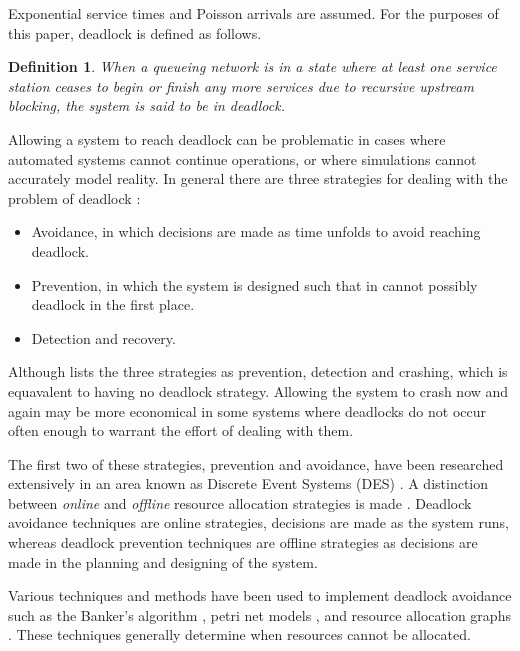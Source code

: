 \documentclass{article}
\newtheorem{definition}{Definition}
\numberwithin{equation}{section}
\begin{document}
Exponential service times and Poisson arrivals are assumed.
For the purposes of this paper, deadlock is defined as follows.\\

\begin{definition}
    When a queueing network is in a state where at least one service
    station ceases to begin or finish any more services due to
    recursive upstream blocking, the system is said to be in deadlock.
\end{definition}


Allowing a system to reach deadlock can be problematic in cases where automated systems cannot continue operations, or where simulations cannot accurately model reality.
In general there are three strategies for dealing with the problem of deadlock \cite{kawadkaretal14, elmagarmid86, venkateshsmith05}:

\begin{itemize}
  \item Avoidance, in which decisions are made as time unfolds to avoid reaching deadlock.
  \item Prevention, in which the system is designed such that in cannot possibly deadlock in the first place.
  \item Detection and recovery.
\end{itemize}

Although \cite{holt72} lists the three strategies as prevention, detection and crashing, which is equavalent to having no deadlock strategy. Allowing the system to crash now and again may be more economical in some systems where deadlocks do not occur often enough to warrant the effort of dealing with them.

The first two of these strategies, prevention and avoidance, have been researched extensively in an area known as Discrete Event Systems (DES) \cite{reveliotis15a, reveliotis15b}.
A distinction between \textit{online} and \textit{offline} resource allocation strategies is made \cite{venkateshsmith05}.
Deadlock avoidance techniques are online strategies, decisions are made as the system runs, whereas deadlock prevention techniques are offline strategies as decisions are made in the planning and designing of the system.

Various techniques and methods have been used to implement deadlock avoidance such as the Banker's algorithm \cite{dijkstra82, kawadkaretal14}, petri net models \cite{viswanadhametal90, ezpeletaetal02}, and resource allocation graphs \cite{belik90}.
These techniques generally determine when resources cannot be allocated.
\end{document}
